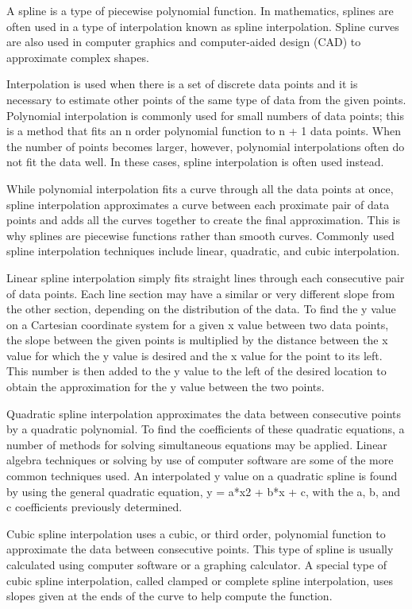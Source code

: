 A spline is a type of piecewise polynomial function. In mathematics, splines are often used in a type of interpolation known as spline interpolation. Spline curves are also used in computer graphics and computer-aided design (CAD) to approximate complex shapes.

Interpolation is used when there is a set of discrete data points and it is necessary to estimate other points of the same type of data from the given points. Polynomial interpolation is commonly used for small numbers of data points; this is a method that fits an n order polynomial function to n + 1 data points. When the number of points becomes larger, however, polynomial interpolations often do not fit the data well. In these cases, spline interpolation is often used instead.

While polynomial interpolation fits a curve through all the data points at once, spline interpolation approximates a curve between each proximate pair of data points and adds all the curves together to create the final approximation. This is why splines are piecewise functions rather than smooth curves. Commonly used spline interpolation techniques include linear, quadratic, and cubic interpolation.

Linear spline interpolation simply fits straight lines through each consecutive pair of data points. Each line section may have a similar or very different slope from the other section, depending on the distribution of the data. To find the y value on a Cartesian coordinate system for a given x value between two data points, the slope between the given points is multiplied by the distance between the x value for which the y value is desired and the x value for the point to its left. This number is then added to the y value to the left of the desired location to obtain the approximation for the y value between the two points.

Quadratic spline interpolation approximates the data between consecutive points by a quadratic polynomial. To find the coefficients of these quadratic equations, a number of methods for solving simultaneous equations may be applied. Linear algebra techniques or solving by use of computer software are some of the more common techniques used. An interpolated y value on a quadratic spline is found by using the general quadratic equation, y = a*x2 + b*x + c, with the a, b, and c coefficients previously determined.

Cubic spline interpolation uses a cubic, or third order, polynomial function to approximate the data between consecutive points. This type of spline is usually calculated using computer software or a graphing calculator. A special type of cubic spline interpolation, called clamped or complete spline interpolation, uses slopes given at the ends of the curve to help compute the function.
